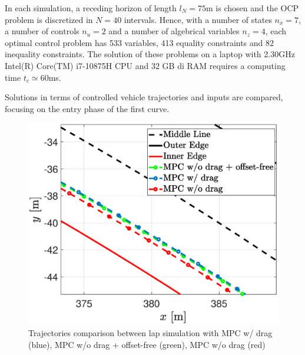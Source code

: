 \documentclass[conference]{IEEEtran} %
\begin{document}
In each simulation, a receding horizon of length $l_N = 75$m is chosen and the OCP problem is discretized in $N = 40$ intervals. Hence, with a number of states $n_x = 7$, a number of controls $n_u = 2$ and a number of algebrical variables $n_z = 4$, each optimal control problem has 533 variables, 413 equality constraints and 82 inequality constraints. The solution of these problems on a laptop with 2.30GHz
Intel(R) Core(TM) i7-10875H CPU and 32 GB di RAM requires a computing time $t_c \simeq 60$ms.

Solutions in terms of controlled vehicle trajectories and inputs are compared, focusing on the entry phase of the first curve.

\begin{figure}[htb] \centering
    \includegraphics[width=1.\linewidth]{Trajectories2}
	\caption{Trajectories comparison between lap simulation with MPC w/ drag (blue), MPC w/o drag + offset-free (green), MPC w/o drag (red)}
	\label{fig:Trajectories2}
\end{figure}
\end{document}
